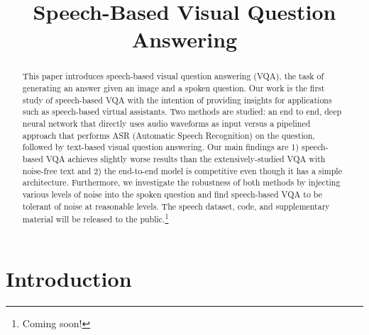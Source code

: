 \documentclass[letterpaper]{article} %
\begin{document}
\title{Speech-Based Visual Question Answering}





\maketitle
\begin{abstract}
This paper introduces speech-based visual question answering (VQA), the task of generating an answer given an image and a spoken question. Our work is the first study of speech-based VQA with the intention of providing insights for applications such as speech-based virtual assistants. Two methods are studied: an end to end, deep neural network that directly uses audio waveforms as input versus a pipelined approach that performs ASR (Automatic Speech Recognition) on the question, followed by text-based visual question answering. Our main findings are 1) speech-based VQA achieves slightly worse results than the extensively-studied VQA with noise-free text and 2) the end-to-end model is competitive even though it has a simple architecture. Furthermore, we investigate the robustness of both methods by injecting various levels of noise into the spoken question and find speech-based VQA to be tolerant of noise at reasonable levels. The speech dataset, code, and supplementary material will be released to the public.\footnote{Coming soon!}

\end{abstract}
\label{sec:intro}
\section{Introduction}
\end{document}
